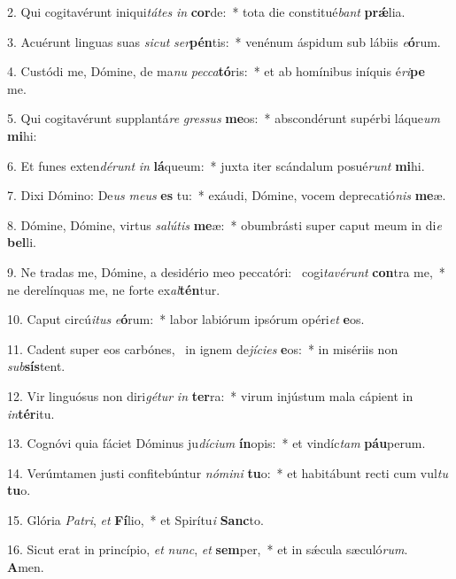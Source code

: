 2. Qui cogitavérunt iniqui\textit{tá}\textit{tes} \textit{in} \textbf{cor}de:~*  tota die constitué\textit{bant} \textbf{prǽ}lia.\

3. Acuérunt linguas suas \textit{sic}\textit{ut} \textit{ser}\textbf{pén}tis:~*  venénum áspidum sub lábiis \textit{e}\textbf{ó}rum.\

4. Custódi me, Dómine, de ma\textit{nu} \textit{pec}\textit{ca}\textbf{tó}ris:~*  et ab homínibus iníquis é\textit{ri}\textbf{pe} me.\

5. Qui cogitavérunt supplantá\textit{re} \textit{gres}\textit{sus} \textbf{me}os:~*  abscondérunt supérbi láque\textit{um} \textbf{mi}hi:\

6. Et funes exten\textit{dé}\textit{runt} \textit{in} \textbf{lá}queum:~*  juxta iter scándalum posué\textit{runt} \textbf{mi}hi.\

7. Dixi Dómino: De\textit{us} \textit{me}\textit{us} \textbf{es} tu:~*  exáudi, Dómine, vocem deprecatió\textit{nis} \textbf{me}æ.\

8. Dómine, Dómine, virtus \textit{sa}\textit{lú}\textit{tis} \textbf{me}æ:~*  obumbrásti super caput meum in di\textit{e} \textbf{bel}li.\

9. Ne tradas me, Dómine, a desidério meo peccatóri: \dag\  cogi\textit{ta}\textit{vé}\textit{runt} \textbf{con}tra me,~*  ne derelínquas me, ne forte ex\textit{al}\textbf{tén}tur.\

10. Caput circú\textit{i}\textit{tus} \textit{e}\textbf{ó}rum:~*  labor labiórum ipsórum opéri\textit{et} \textbf{e}os.\

11. Cadent super eos carbónes, \dag\  in ignem de\textit{jí}\textit{ci}\textit{es} \textbf{e}os:~*  in misériis non \textit{sub}\textbf{sís}tent.\

12. Vir linguósus non diri\textit{gé}\textit{tur} \textit{in} \textbf{ter}ra:~*  virum injústum mala cápient in \textit{in}\textbf{tér}itu.\

13. Cognóvi quia fáciet Dóminus ju\textit{dí}\textit{ci}\textit{um} \textbf{ín}opis:~*  et vindíc\textit{tam} \textbf{páu}perum.\

14. Verúmtamen justi confitebúntur \textit{nó}\textit{mi}\textit{ni} \textbf{tu}o:~*  et habitábunt recti cum vul\textit{tu} \textbf{tu}o.\

15. Glória \textit{Pa}\textit{tri}, \textit{et} \textbf{Fí}lio,~*  et Spirítu\textit{i} \textbf{Sanc}to.\

16. Sicut erat in princípio, \textit{et} \textit{nunc}, \textit{et} \textbf{sem}per,~*  et in sǽcula sæculó\textit{rum}. \textbf{A}men.\

